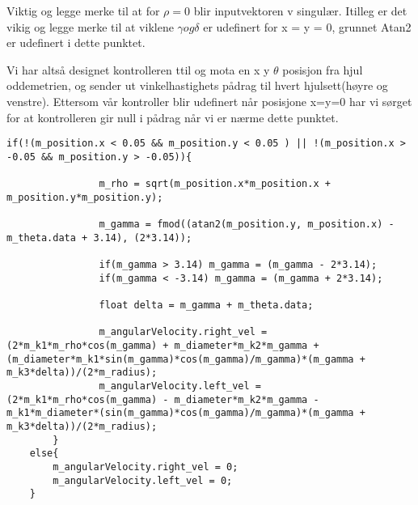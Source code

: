 Viktig og legge merke til at for $\rho = 0$ blir inputvektoren v singulær. Itilleg er det vikig og legge merke til at viklene $\gamma og \delta$ er udefinert for x = y = 0, grunnet Atan2 er udefinert i dette punktet. 

Vi har altså designet kontrolleren ttil og mota en x y $\theta$ posisjon fra hjul oddemetrien, og sender ut vinkelhastighets pådrag til hvert hjulsett(høyre og venstre). 
Ettersom vår kontroller blir udefinert når posisjone x=y=0 har vi sørget for at kontrolleren gir null i pådrag når vi er nærme dette punktet. 
\begin{lstlisting}[frame=single]
        if(!(m_position.x < 0.05 && m_position.y < 0.05 ) || !(m_position.x > -0.05 && m_position.y > -0.05)){

        		m_rho = sqrt(m_position.x*m_position.x + m_position.y*m_position.y);

        		m_gamma = fmod((atan2(m_position.y, m_position.x) - m_theta.data + 3.14), (2*3.14));
		
	    		if(m_gamma > 3.14) m_gamma = (m_gamma - 2*3.14);
	    		if(m_gamma < -3.14) m_gamma = (m_gamma + 2*3.14);
	   
        		float delta = m_gamma + m_theta.data;

	    		m_angularVelocity.right_vel = (2*m_k1*m_rho*cos(m_gamma) + m_diameter*m_k2*m_gamma + (m_diameter*m_k1*sin(m_gamma)*cos(m_gamma)/m_gamma)*(m_gamma + m_k3*delta))/(2*m_radius);
        		m_angularVelocity.left_vel = (2*m_k1*m_rho*cos(m_gamma) - m_diameter*m_k2*m_gamma - m_k1*m_diameter*(sin(m_gamma)*cos(m_gamma)/m_gamma)*(m_gamma + m_k3*delta))/(2*m_radius);   
        }
	else{
	    m_angularVelocity.right_vel = 0;
	    m_angularVelocity.left_vel = 0;
	}
\end{lstlisting}





